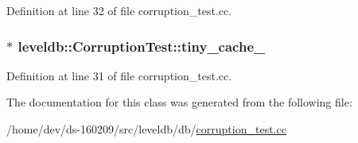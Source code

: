 Definition at line 32 of file corruption\+\_\+test.\+cc.

\hypertarget{classleveldb_1_1_corruption_test_afc8ff2f272ee3da2756acc21c37750d5}{}
\subsubsection[{tiny\+\_\+cache\+\_\+}]{$\ast$ leveldb\+::\+Corruption\+Test\+::tiny\+\_\+cache\+\_\+}\label{classleveldb_1_1_corruption_test_afc8ff2f272ee3da2756acc21c37750d5}


Definition at line 31 of file corruption\+\_\+test.\+cc.



The documentation for this class was generated from the following file\+:\begin{DoxyCompactItemize}
\item 
/home/dev/ds-\/160209/src/leveldb/db/\hyperlink{corruption__test_8cc}{corruption\+\_\+test.\+cc}\end{DoxyCompactItemize}
